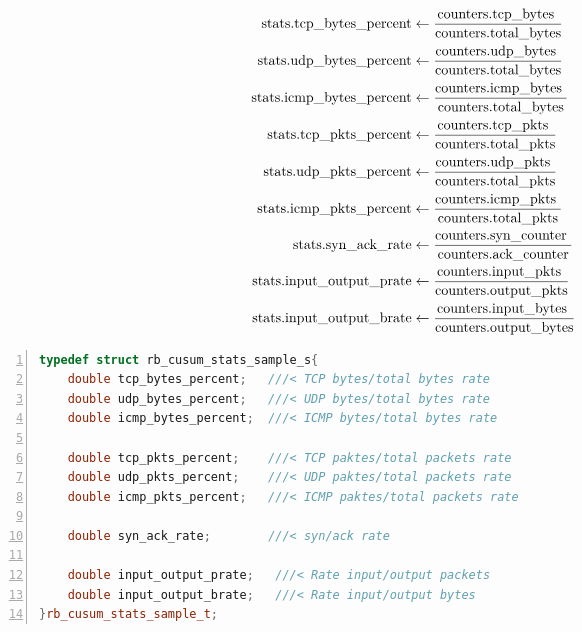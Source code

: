 \begin{align}
 \text{stats.tcp\_bytes\_percent}  &\gets \frac{\text{counters.tcp\_bytes   }}{\text{counters.total\_bytes}}
                                                                                    \LABEQ{ExtractCusumTcpBytesRate}\\
 \text{stats.udp\_bytes\_percent}  &\gets \frac{\text{counters.udp\_bytes   }}{\text{counters.total\_bytes}}\\
 \text{stats.icmp\_bytes\_percent} &\gets \frac{\text{counters.icmp\_bytes  }}{\text{counters.total\_bytes}}\\
%
 \text{stats.tcp\_pkts\_percent}   &\gets \frac{\text{counters.tcp\_pkts    }}{\text{counters.total\_pkts}}\\
 \text{stats.udp\_pkts\_percent}   &\gets \frac{\text{counters.udp\_pkts    }}{\text{counters.total\_pkts}}\\
 \text{stats.icmp\_pkts\_percent}  &\gets \frac{\text{counters.icmp\_pkts   }}{\text{counters.total\_pkts}}\\
%
 \text{stats.syn\_ack\_rate}       &\gets \frac{\text{counters.syn\_counter }}{\text{counters.ack\_counter}}\\
 \text{stats.input\_output\_prate} &\gets \frac{\text{counters.input\_pkts  }}{\text{counters.output\_pkts}}\\
 \text{stats.input\_output\_brate} &\gets \frac{\text{counters.input\_bytes }}{\text{counters.output\_bytes}}
                                                                                     \LABEQ{ExtractCusumInputOutputRate}
\end{align}

\begin{lstlisting}[language=C++,caption={Estructura estadísticos CUSUM}, breaklines=true, 
label=code:RbCusumStats,numbers=left,float=htbp]
typedef struct rb_cusum_stats_sample_s{
    double tcp_bytes_percent;   ///< TCP bytes/total bytes rate
    double udp_bytes_percent;   ///< UDP bytes/total bytes rate
    double icmp_bytes_percent;  ///< ICMP bytes/total bytes rate

    double tcp_pkts_percent;    ///< TCP paktes/total packets rate
    double udp_pkts_percent;    ///< UDP paktes/total packets rate
    double icmp_pkts_percent;   ///< ICMP paktes/total packets rate

    double syn_ack_rate;        ///< syn/ack rate

    double input_output_prate;   ///< Rate input/output packets
    double input_output_brate;   ///< Rate input/output bytes
}rb_cusum_stats_sample_t;
\end{lstlisting}

